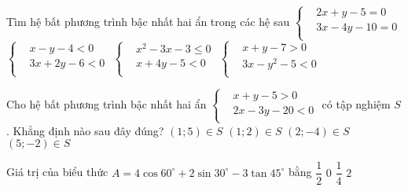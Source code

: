 \begin{ex}%
	Tìm hệ bất phương trình bậc nhất hai ẩn trong các hệ sau
	\choice
	{$ \left\{\begin{aligned}
			&2x+y-5=0\\
			&3x-4y-10=0\\
		\end{aligned}\right.$}
	{\True $ \left\{\begin{aligned}
			&x-y-4<0\\
			&3x+2y-6<0\\
		\end{aligned}\right.$}
	{$ \left\{\begin{aligned}
			&x^2-3x-3 \leq 0\\
			&x+4y-5<0\\
		\end{aligned}\right.$}
	{$ \left\{\begin{aligned}
			&x+y-7>0\\
			&3x-y^2-5<0\\
		\end{aligned}\right.$}
\end{ex}
\begin{ex}%
	Cho hệ bất phương trình bậc nhất hai ẩn $ \left\{\begin{aligned}
		&x+y-5>0\\
		&2x-3y-20<0\\
	\end{aligned}\right.$ có tập nghiệm $S$. Khẳng định nào sau đây đúng?
	\choice
	{\True $(1;5) \in S$}
	{$(1;2) \in S$}
	{$(2;-4) \in S$}
	{$(5;-2) \in S$}
\end{ex}
\begin{ex}%
	Giá trị của biểu thức $A=4 \cos 60^{\circ}+2\sin 30^{\circ}-3\tan 45^{\circ}$ bằng	
	\choice
	{$\dfrac{1}{2}$}
	{\True $0$}
	{$\dfrac{1}{4}$}
	{$2$}
\end{ex}
